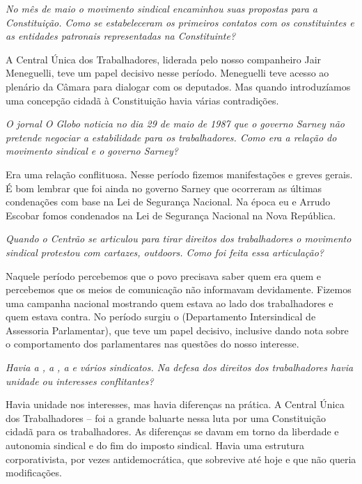 \medskip

\noindent\emph{No mês de maio o movimento sindical encaminhou suas propostas
para a Constituição. Como se estabeleceram os primeiros contatos com os
constituintes e as entidades patronais representadas na Constituinte?}

A Central Única dos Trabalhadores, liderada pelo
nosso companheiro Jair Meneguelli, teve um papel decisivo nesse período.
Meneguelli teve acesso ao plenário da Câmara para dialogar com os
deputados. Mas quando introduzíamos uma concepção cidadã à Constituição
havia várias contradições.

\medskip

\noindent\emph{O jornal \emph{O Globo} noticia no dia 29 de maio de 1987 que o governo
Sarney não pretende negociar a estabilidade para os trabalhadores.
Como era a relação do movimento sindical e o governo Sarney?}

Era uma relação conflituosa. Nesse período fizemos
manifestações e greves gerais. É bom lembrar que foi ainda no governo
Sarney que ocorreram as últimas condenações com base na Lei de Segurança
Nacional. Na época eu e Arrudo Escobar fomos condenados na Lei de
Segurança Nacional na Nova República.

\medskip

\noindent\emph{Quando o Centrão se articulou para tirar direitos dos
trabalhadores o movimento sindical protestou com cartazes, outdoors.
Como foi feita essa articulação?}

Naquele período percebemos que o povo precisava
saber quem era quem e percebemos que os meios de comunicação não
informavam devidamente. Fizemos uma campanha nacional mostrando quem
estava ao lado dos trabalhadores e quem estava contra. No período surgiu
o  (Departamento Intersindical de Assessoria Parlamentar), que teve
um papel decisivo, inclusive dando nota sobre o comportamento dos
parlamentares nas questões do nosso interesse.

\medskip

\noindent\emph{Havia a , a , a  e vários sindicatos. Na defesa dos
direitos dos trabalhadores havia unidade ou interesses conflitantes?}

Havia unidade nos interesses, mas havia diferenças
na prática. A Central Única dos Trabalhadores --  foi a grande
baluarte nessa luta por uma Constituição cidadã para os trabalhadores.
As diferenças se davam em torno da liberdade e autonomia sindical e do
fim do imposto sindical. Havia uma estrutura corporativista, por vezes
antidemocrática, que sobrevive até hoje e que não queria modificações.

